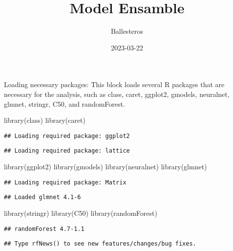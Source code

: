 \documentclass[
]{article}
\title{Model Ensamble}
\author{Ballesteros}
\date{2023-03-22}
\newenvironment{Shaded}{\begin{snugshade}}{\end{snugshade}}
\newcommand{\FunctionTok}[1]{\textcolor[rgb]{0.00,0.00,0.00}{#1}}
\newcommand{\NormalTok}[1]{#1}
\begin{document}
\maketitle

Loading necessary packages: This block loads several R packages that are
necessary for the analysis, such as class, caret, ggplot2, gmodels,
neuralnet, glmnet, stringr, C50, and randomForest.

\begin{Shaded}
\begin{Highlighting}[]
\FunctionTok{library}\NormalTok{(class)}
\FunctionTok{library}\NormalTok{(caret)}
\end{Highlighting}
\end{Shaded}

\begin{verbatim}
## Loading required package: ggplot2
\end{verbatim}

\begin{verbatim}
## Loading required package: lattice
\end{verbatim}

\begin{Shaded}
\begin{Highlighting}[]
\FunctionTok{library}\NormalTok{(ggplot2)}
\FunctionTok{library}\NormalTok{(gmodels)}
\FunctionTok{library}\NormalTok{(neuralnet)}
\FunctionTok{library}\NormalTok{(glmnet)}
\end{Highlighting}
\end{Shaded}

\begin{verbatim}
## Loading required package: Matrix
\end{verbatim}

\begin{verbatim}
## Loaded glmnet 4.1-6
\end{verbatim}

\begin{Shaded}
\begin{Highlighting}[]
\FunctionTok{library}\NormalTok{(stringr)}
\FunctionTok{library}\NormalTok{(C50)}
\FunctionTok{library}\NormalTok{(randomForest)}
\end{Highlighting}
\end{Shaded}

\begin{verbatim}
## randomForest 4.7-1.1
\end{verbatim}

\begin{verbatim}
## Type rfNews() to see new features/changes/bug fixes.
\end{verbatim}
\end{document}
